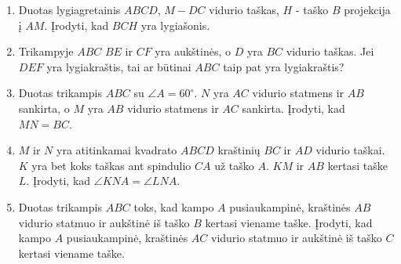 \begin{enumerate}
\item Duotas lygiagretainis $ABCD$, $M-DC$ vidurio taškas, $H$ - taško $B$
  projekcija į $AM$. Įrodyti, kad $BCH$ yra lygiašonis.
\item Trikampyje $ABC$ $BE$ ir $CF$ yra aukštinės, o $D$ yra $BC$ vidurio
  taškas. Jei $DEF$ yra lygiakraštis, tai ar būtinai $ABC$ taip pat yra
  lygiakraštis?
\item Duotas trikampis $ABC$ su $\angle A = 60^\circ$. $N$ yra $AC$ vidurio
  statmens ir $AB$ sankirta, o $M$ yra $AB$ vidurio statmens ir $AC$
  sankirta. Įrodyti, kad $MN = BC$.
\item $M$ ir $N$ yra atitinkamai kvadrato $ABCD$ kraštinių $BC$ ir $AD$
  vidurio taškai. $K$ yra bet koks taškas ant spindulio $CA$ už taško $A$.
  $KM$ ir $AB$ kertasi taške $L$. Įrodyti, kad $\angle KNA = \angle LNA$.
\item Duotas trikampis $ABC$ toks, kad kampo $A$ pusiaukampinė, kraštinės
  $AB$ vidurio statmuo ir aukštinė iš taško $B$ kertasi viename taške.
  Įrodyti, kad kampo $A$ pusiaukampinė, kraštinės $AC$ vidurio statmuo ir
  aukštinė iš taško $C$ kertasi viename taške.

\end{enumerate}
